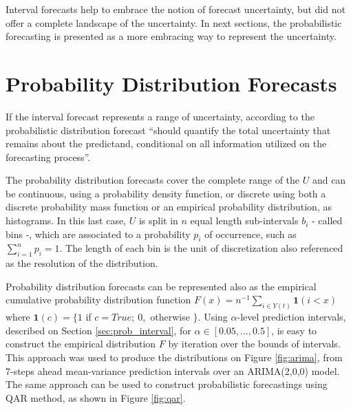 Interval forecasts help to embrace the notion of forecast uncertainty, but did not offer a complete landscape of the uncertainty. In next sections, the probabilistic forecasting is presented as a more embracing way to represent the uncertainty.

%
\section{Probability Distribution Forecasts}
\label{sec:prob_distribution}

If the interval forecast represents a range of uncertainty, according to \cite{Krzysztofowicz2001} the probabilistic distribution forecast ``should quantify the total uncertainty that remains about the predictand, conditional on all information utilized on the forecasting process''. 

The probability distribution forecasts cover the complete range of the $U$ and can be continuous, using a probability density function, or discrete using both a discrete probability mass function or an empirical probability distribution, as histograms. In this last case, $U$ is split in $n$ equal length sub-intervals $b_i$ - called bins -, which are associated to a probability $p_i$ of occurrence, such as $\sum_{i=1}^n p_i = 1$. The length of each bin is the unit of discretization also referenced as the resolution of the distribution. 

Probability distribution forecasts can be represented also as the empirical cumulative probability distribution function $F(x) = n^{-1}\sum_{i\in Y(t)} \mathbf{1}(i < x)$ where $\mathbf{1}(c) = \{1$ if $c = True;\ 0,$ otherwise $\}$. Using $\alpha$-level prediction intervals, described on Section \ref{sec:prob_interval}, for $\alpha \in [0.05, ..., 0.5]$, is easy to construct the empirical distribution $F$ by iteration over the bounds of intervals. This approach was used to produce the distributions on Figure \ref{fig:arima}, from 7-steps ahead mean-variance prediction intervals over an ARIMA(2,0,0) model. The same approach can be used to construct probabilistic forecastings using QAR method, as shown in Figure \ref{fig:qar}.

